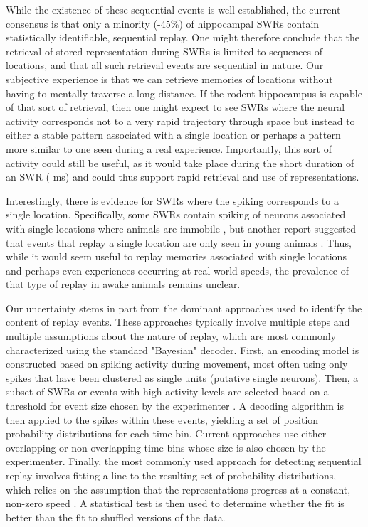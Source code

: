 \documentclass[times, twoside]{zHenriquesLab-StyleBioRxiv}
\begin{document}
While the existence of these sequential events is well established, the current consensus is that only a minority (-45\%) of hippocampal SWRs contain statistically identifiable, sequential replay. One might therefore conclude that the retrieval of stored representation during SWRs is limited to sequences of locations, and that all such retrieval events are sequential in nature. Our subjective experience is that we can retrieve memories of locations without having to mentally traverse a long distance. If the rodent hippocampus is capable of that sort of retrieval, then one might expect to see SWRs where the neural activity corresponds not to a very rapid trajectory through space but instead to either a stable pattern associated with a single location or perhaps a pattern more similar to one seen during a real experience. Importantly, this sort of activity could still be useful, as it would take place during the short duration of an SWR ( ms) and could thus support rapid retrieval and use of representations.

Interestingly, there is evidence for SWRs where the spiking corresponds to a single location. Specifically, some SWRs contain spiking of neurons associated with single locations where animals are immobile \cite{JaiDistincthippocampalcorticalmemory2017}, but another report suggested that events that replay a single location are only seen in young animals \cite{StellaHippocampalReactivationRandom2019}. Thus, while it would seem useful to replay memories associated with single locations and perhaps even experiences occurring at real-world speeds, the prevalence of that type of replay in awake animals remains unclear.

Our uncertainty stems in part from the dominant approaches used to identify the content of replay events. These approaches typically involve multiple steps and multiple assumptions about the nature of replay, which are most commonly characterized using the standard "Bayesian" decoder. First, an encoding model is constructed based on spiking activity during movement, most often using only spikes that have been clustered as single units (putative single neurons). Then, a subset of SWRs or events with high activity levels are selected based on a threshold for event size chosen by the experimenter \cite{FosterReversereplaybehavioural2006, DibaForwardreversehippocampal2007, KarlssonAwakereplayremote2009, StellaHippocampalReactivationRandom2019}. A decoding algorithm is then applied to the spikes within these events, yielding a set of position probability distributions for each time bin. Current approaches use either overlapping or non-overlapping time bins whose size is also chosen by the experimenter. Finally, the most commonly used approach for detecting sequential replay involves fitting a line to the resulting set of probability distributions, which relies on the assumption that the representations progress at a constant, non-zero speed \cite{FosterReversereplaybehavioural2006, DibaForwardreversehippocampal2007, KarlssonAwakereplayremote2009}. A statistical test is then used to determine whether the fit is better than the fit to shuffled versions of the data.
\end{document}
